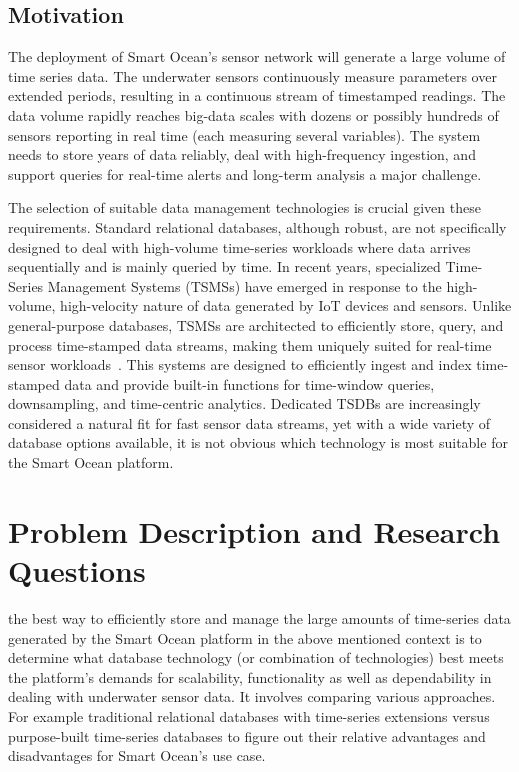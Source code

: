 \newpage
\subsection{Motivation}
The deployment of Smart Ocean's sensor network will generate a large volume of
time series data. The underwater sensors continuously measure parameters over
extended periods, resulting in a continuous stream of timestamped readings. The
data volume rapidly reaches big-data scales with dozens or possibly hundreds of
sensors reporting in real time (each measuring several variables).
The system needs to store years of data reliably, deal with high-frequency
ingestion, and support queries for real-time alerts and long-term analysis a
major challenge.

The selection of suitable data management technologies is crucial given these
requirements. Standard relational databases, although robust, are
not specifically designed to deal with high-volume time-series workloads
where data arrives sequentially and is mainly queried by time. In recent years,
specialized Time-Series Management Systems (TSMSs) have emerged in response to
the high-volume, high-velocity nature of data generated by IoT devices and
sensors. Unlike general-purpose databases, TSMSs are architected to efficiently
store, query, and process time-stamped data streams, making them uniquely
suited for real-time sensor workloads~\cite{Jensen2017}. This systems are
designed to efficiently ingest and index time-stamped data
and provide built-in functions for time-window queries, downsampling, and
time-centric analytics. Dedicated TSDBs are increasingly considered a natural
fit for fast sensor data streams, yet with a wide variety of database options
available, it is not obvious which technology is most suitable for the Smart
Ocean platform.

\newpage
\section{Problem Description and Research Questions}
the best way to efficiently store and manage
the large amounts of time-series data generated by the Smart Ocean platform in
the above mentioned context is to determine what database
technology (or combination of technologies) best meets the platform's demands
for scalability, functionality as well as dependability in dealing with
underwater sensor data. It involves comparing various approaches. For example
traditional relational databases with time-series extensions versus
purpose-built
time-series databases to figure out their relative advantages and disadvantages
for Smart Ocean's use case.

